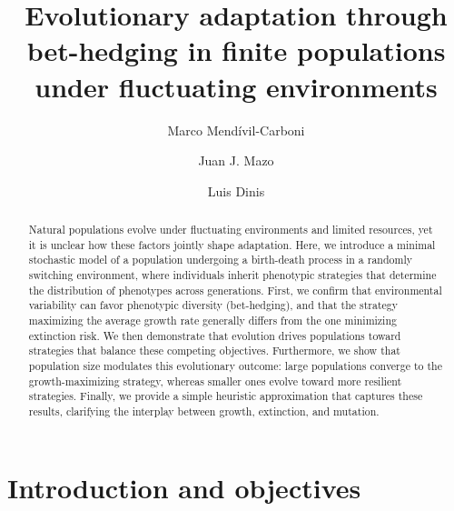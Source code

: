 \documentclass[aps,pre,reprint,10pt,superscriptaddress]{revtex4-2}
\begin{document}
\title{Evolutionary adaptation through bet-hedging in finite populations under fluctuating environments}
\author{Marco Mendívil-Carboni}
\author{Juan J. Mazo}
\author{Luis Dinis}

\begin{abstract}
    Natural populations evolve under fluctuating environments and limited resources, yet it is unclear how these factors jointly shape adaptation. Here, we introduce a minimal stochastic model of a population undergoing a birth-death process in a randomly switching environment, where individuals inherit phenotypic strategies that determine the distribution of phenotypes across generations. First, we confirm that environmental variability can favor phenotypic diversity (bet-hedging), and that the strategy maximizing the average growth rate generally differs from the one minimizing extinction risk. We then demonstrate that evolution drives populations toward strategies that balance these competing objectives. Furthermore, we show that population size modulates this evolutionary outcome: large populations converge to the growth-maximizing strategy, whereas smaller ones evolve toward more resilient strategies. Finally, we provide a simple heuristic approximation that captures these results, clarifying the interplay between growth, extinction, and mutation.
\end{abstract}

\maketitle

\graphicspath{{figures/}}

\section{Introduction and objectives} \label{sec:introduction}
\end{document}
